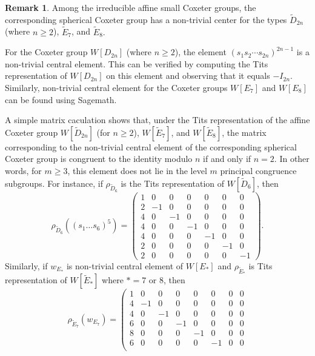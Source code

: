\documentclass[12pt]{amsart}
\theoremstyle{definition}
\newtheorem{remark}[equation]{Remark}
\numberwithin{equation}{section}
\begin{document}
\begin{remark}\label{rmk:center}
Among the irreducible affine small Coxeter groups, the corresponding spherical Coxeter group has a non-trivial center for the types $\tilde{D}_{2n}$ (where $ n \geq 2 $), $ \tilde{E}_7 $, and $ \tilde{E}_8.$

For the Coxeter group $W[D_{2n}]$ (where  $ n \geq 2 $), the element $(s_1s_2\cdots s_{2n})^{2n-1}$ is a non-trivial central element. This can be verified by computing the Tits representation of $W[D_{2n}]$ on this element and observing that it equals $-I_{2n}$.
 Similarly, non-trivial central element for the Coxeter groups $W[E_7]$ and $W[E_8]$ can be found using Sagemath.


 A simple matrix caculation shows that, under the Tits representation of the affine Coxeter group $W[\tilde{D}_{2n}]$ (for $ n \geq 2 $), $ W[\tilde{E}_7] $, and $ W[\tilde{E}_8]$, the matrix corresponding to the non-trivial central element of the corresponding spherical Coxeter group is congruent to the identity modulo $n$ if and only if $n=2$. In other words, for $m\geq 3$, this element does not lie in the level $m$ principal congruence subgroups. For instance, if $\rho_{\tilde{D}_{6}}$ is the Tits representation of $W[\tilde{D}_{6}]$, then 
$$
\rho_{\tilde{D}_{6}}((s_1\ldots s_6)^5)=\left(\begin{matrix}
1 & 0 & 0 & 0 & 0 & 0 & 0 \\
2 & -1 & 0 & 0 & 0 & 0 & 0 \\
4 & 0 & -1 & 0 & 0 & 0 & 0 \\
4 & 0 & 0 & -1 & 0 & 0 & 0 \\
4 & 0 & 0 & 0 & -1 & 0 & 0 \\
2 & 0 & 0 & 0 & 0 & -1 & 0 \\
2 & 0 & 0 & 0 & 0 & 0 & -1
\end{matrix}\right).
$$
Similarly, if $w_{E_*}$ is non-trivial central element of $W[E_*]$ and $\rho_{\tilde{E}_*}$ is Tits representation of $W[\tilde{E}_*]$ where $*=7$ or $8$, then 
$$
\rho_{\tilde{E}_7}(w_{E_7})=\left(\begin{matrix}
1 & 0 & 0 & 0 & 0 & 0 & 0 & 0 \\
4 & -1 & 0 & 0 & 0 & 0 & 0 & 0 \\
4 & 0 & -1 & 0 & 0 & 0 & 0 & 0 \\
6 & 0 & 0 & -1 & 0 & 0 & 0 & 0 \\
8 & 0 & 0 & 0 & -1 & 0 & 0 & 0 \\
6 & 0 & 0 & 0 & 0 & -1 & 0 & 0 \\

\end{matrix}$$
\end{remark}
\end{document}
